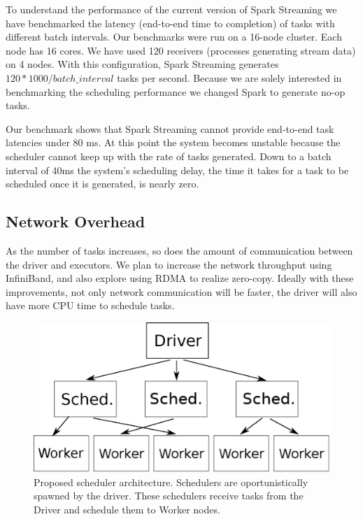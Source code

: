 To understand the performance of the current version of Spark Streaming we have benchmarked the latency (end-to-end time to completion) of tasks with different batch intervals. 
Our benchmarks were run on a 16-node cluster. Each node has 16 cores. We have used 120 receivers (processes generating stream data) on 4 nodes. 
With this configuration, Spark Streaming generates $120*1000/batch\_interval$ tasks per second.
Because we are solely interested in benchmarking the scheduling performance we changed Spark to generate no-op tasks.

Our benchmark shows that Spark Streaming cannot provide end-to-end task latencies under 80 ms. At this point the system becomes unstable because the scheduler cannot keep up with the rate of tasks generated. Down to a batch interval of 40ms the system's scheduling delay, the time it takes for a task to be scheduled once it is generated, is nearly zero.


\subsection{Network Overhead}
As the number of tasks increases, so does the amount of communication between the driver and executors. We plan to increase the network throughput using InfiniBand, and also explore using RDMA to realize zero-copy. Ideally with these improvements, not only network communication will be faster, the driver will also have more CPU time to schedule tasks.


\begin{figure}[t!]
  \begin{center}
    \includegraphics[scale=0.45]{scheduler_architecture.eps}
  \end{center}
  \caption{Proposed scheduler architecture. Schedulers are oportunistically spawned by the driver. These schedulers receive tasks from the Driver and schedule them to Worker nodes.}
  \label{fig:schedarch}
\end{figure}

